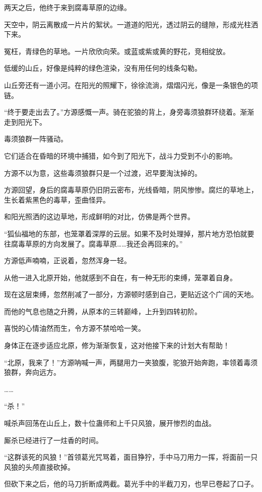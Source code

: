 \begin{this_body}
两天之后，他终于来到腐毒草原的边缘。

天空中，阴云离散成一片片的絮状。一道道的阳光，透过阴云的缝隙，形成光柱洒下来。

冤枉，青绿色的草地。一片欣欣向荣。或蓝或紫或黄的野花，竞相绽放。

低缓的山丘，好像是纯粹的绿色渲染，没有用任何的线条勾勒。

山丘旁还有一道小河。在阳光的照耀下，徐徐流淌，熠熠闪光，像是一条银色的项链。

“终于要走出去了。”方源感慨一声。骑在驼狼的背上，身旁毒须狼群环绕着。渐渐走到阳光下。

毒须狼群一阵骚动。

它们适合在昏暗的环境中捕猎，如今到了阳光下，战斗力受到不小的影响。

方源不以为意，这些毒须狼群只是一个过渡，迟早要淘汰掉的。

方源回望，身后的腐毒草原仍旧阴云密布，光线昏暗，阴风惨惨。腐烂的草地上，生长着紫黑色的毒草，歪曲怪异。

和阳光照洒的这边草地，形成鲜明的对比，仿佛是两个世界。

“狐仙福地的东部，也笼罩着深厚的云层。如果不及时处理掉，那片地方恐怕就要往腐毒草原的方向发展了。腐毒草原……我还会再回来的。”

方源低声喃喃，正说着，忽然浑身一轻。

从他一进入北原开始，他就感到不自在，有一种无形的束缚，笼罩着自身。

现在这层束缚，忽然削减了一部分，方源顿时感到自己，更贴近这个广阔的天地。

而他的气息也随之升腾，从原本的三转巅峰，上升到四转初阶。

喜悦的心情油然而生，令方源不禁哈哈一笑。

身体正在逐步适应北原，修为渐渐恢复，这对他接下来的计划大有帮助！

“北原，我来了！”方源呐喊一声，两腿用力一夹狼腹，驼狼开始奔跑，率领着毒须狼群，奔向远方。

……

“杀！”

喊杀声回荡在山丘上，数十位蛊师和上千只风狼，展开惨烈的血战。

厮杀已经进行了一炷香的时间。

“这群该死的风狼！”首领葛光咒骂着，面目狰狞，手中马刀用力一挥，将面前一只风狼的头颅直接砍掉。

但砍下来之后，他的马刀折断成两截。葛光手中的半截刀刃，也早已卷起了口子。


\end{this_body}
